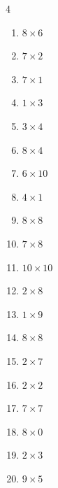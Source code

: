 \begin{multicols}{4}
\begin{enumerate}
  \item $8\times 6$
        \phantom{$=48$}

  \item $7\times 2$
        \phantom{$=14$}

  \item $7\times 1$
        \phantom{$=7$}

  \item $1\times 3$
        \phantom{$=3$}

  \item $3\times 4$
        \phantom{$=12$}

  \item $8\times 4$
        \phantom{$=32$}

  \item $6\times 10$
        \phantom{$=60$}

\columnbreak %

\resetques

  \item $4\times 1$
        \phantom{$=4$}

  \item $8\times 8$
        \phantom{$=64$}

  \item $7\times 8$
        \phantom{$=56$}

  \item $10\times 10$
        \phantom{$=100$}

  \item $2\times 8$
        \phantom{$=16$}

  \item $1\times 9$
        \phantom{$=9$}

  \item $8\times 8$
        \phantom{$=64$}

  \item $2\times 7$
        \phantom{$=14$}

  \item $2\times 2$
        \phantom{$=4$}

  \item $7\times 7$
        \phantom{$=49$}

  \item $8\times 0$
        \phantom{$=0$}

  \item $2\times 3$
        \phantom{$=6$}

  \item $9\times 5$
        \phantom{$=45$}


\end{enumerate}
\end{multicols}
